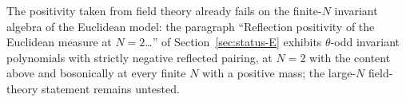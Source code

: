  The positivity taken from field theory already fails on the finite-\(N\) invariant algebra of the Euclidean model: the paragraph ``Reflection positivity of the Euclidean measure at \(N=2\)\dots{}'' of Section~\ref{sec:status-E} exhibits \(\theta\)-odd invariant polynomials with strictly negative reflected pairing, at \(N=2\) with the content above and bosonically at every finite \(N\) with a positive mass; the large-\(N\) field-theory statement remains untested.
